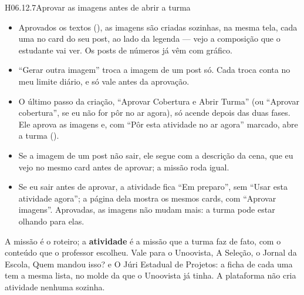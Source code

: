 \begin{historia}{H06.12.7}{Aprovar as imagens antes de abrir a turma}{\parcial}
\aceite
\begin{itemize}
  \item Aprovados os textos (), as imagens são criadas sozinhas,
    na mesma tela, cada uma no card do seu post, ao lado da legenda --- vejo a
    composição que o estudante vai ver. Os posts de números já vêm com gráfico.
  \item \enquote{Gerar outra imagem} troca a imagem de um post só. Cada troca
    conta no meu limite diário, e só vale antes da aprovação.
  \item O último passo da criação, \enquote{Aprovar Cobertura e Abrir Turma}
    (ou \enquote{Aprovar cobertura}, se eu não for pôr no ar agora), só acende
    depois das duas fases. Ele aprova as imagens e, com \enquote{Pôr esta
    atividade no ar agora} marcado, abre a turma ().
  \item Se a imagem de um post não sair, ele segue com a descrição da cena, que
    eu vejo no mesmo card antes de aprovar; a missão roda igual.
  \item Se eu sair antes de aprovar, a atividade fica \enquote{Em preparo}, sem
    \enquote{Usar esta atividade agora}; a página dela mostra os mesmos cards,
    com \enquote{Aprovar imagens}. Aprovadas, as imagens não mudam mais: a
    turma pode estar olhando para elas.
\end{itemize}
\end{historia}


A missão é o roteiro; a \textbf{atividade} é a missão que a turma faz de fato,
com o conteúdo que o professor escolheu. Vale para o Unoovista, A Seleção, o
Jornal da Escola, Quem mandou isso? e O Júri Estadual de Projetos: a ficha de cada uma tem a mesma lista, no
molde da que o Unoovista já tinha. A plataforma não cria atividade nenhuma
sozinha.

